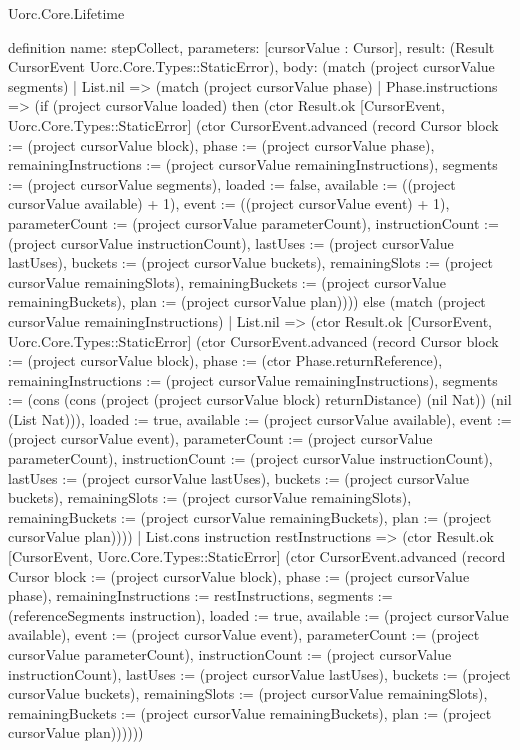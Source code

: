 \begin{lexlean}{Uorc.Core.Lifetime}
\begin{semanticmodule}
definition{
  name: stepCollect,
  parameters: [cursorValue : Cursor],
  result: (Result CursorEvent Uorc.Core.Types::StaticError),
  body: (match (project cursorValue segments)
    | List.nil => (match (project cursorValue phase)
      | Phase.instructions => (if (project cursorValue loaded) then (ctor Result.ok [CursorEvent, Uorc.Core.Types::StaticError] (ctor CursorEvent.advanced (record Cursor {block := (project cursorValue block), phase := (project cursorValue phase), remainingInstructions := (project cursorValue remainingInstructions), segments := (project cursorValue segments), loaded := false, available := ((project cursorValue available) + 1), event := ((project cursorValue event) + 1), parameterCount := (project cursorValue parameterCount), instructionCount := (project cursorValue instructionCount), lastUses := (project cursorValue lastUses), buckets := (project cursorValue buckets), remainingSlots := (project cursorValue remainingSlots), remainingBuckets := (project cursorValue remainingBuckets), plan := (project cursorValue plan)}))) else (match (project cursorValue remainingInstructions)
        | List.nil => (ctor Result.ok [CursorEvent, Uorc.Core.Types::StaticError] (ctor CursorEvent.advanced (record Cursor {block := (project cursorValue block), phase := (ctor Phase.returnReference), remainingInstructions := (project cursorValue remainingInstructions), segments := (cons (cons (project (project cursorValue block) returnDistance) (nil Nat)) (nil (List Nat))), loaded := true, available := (project cursorValue available), event := (project cursorValue event), parameterCount := (project cursorValue parameterCount), instructionCount := (project cursorValue instructionCount), lastUses := (project cursorValue lastUses), buckets := (project cursorValue buckets), remainingSlots := (project cursorValue remainingSlots), remainingBuckets := (project cursorValue remainingBuckets), plan := (project cursorValue plan)})))
        | List.cons instruction restInstructions => (ctor Result.ok [CursorEvent, Uorc.Core.Types::StaticError] (ctor CursorEvent.advanced (record Cursor {block := (project cursorValue block), phase := (project cursorValue phase), remainingInstructions := restInstructions, segments := (referenceSegments instruction), loaded := true, available := (project cursorValue available), event := (project cursorValue event), parameterCount := (project cursorValue parameterCount), instructionCount := (project cursorValue instructionCount), lastUses := (project cursorValue lastUses), buckets := (project cursorValue buckets), remainingSlots := (project cursorValue remainingSlots), remainingBuckets := (project cursorValue remainingBuckets), plan := (project cursorValue plan)})))))
}
\end{semanticmodule}
\end{lexlean}
